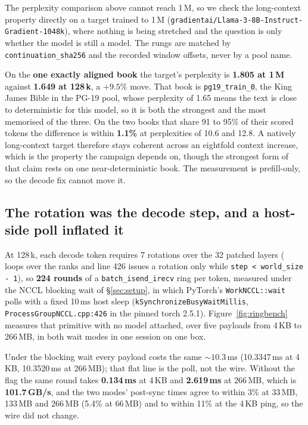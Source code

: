 \documentclass{article}
\begin{document}
The perplexity comparison above cannot reach 1\,M, so we check the long-context property
directly on a target trained to 1\,M
(\texttt{gradientai/Llama-3-8B-Instruct-Gradient-1048k}), where nothing is being stretched and
the question is only whether the model is still a model. The rungs are matched by
\texttt{continuation\_sha256} and the recorded window offsets, never by a pool name.

On the \textbf{one exactly aligned book} the target's perplexity is \textbf{1.805 at 1\,M}
against \textbf{1.649 at 128\,k}, a \textbf{$+9.5\%$} move. That book is
\texttt{pg19\_train\_0}, the King James Bible in the PG-19 pool, whose perplexity of 1.65
means the text is close to deterministic for this model, so it is both the strongest and the
most memorised of the three. On the two books that share 91 to 95\% of their scored tokens the
difference is within \textbf{1.1\%} at perplexities of 10.6 and 12.8. A natively long-context target therefore stays coherent across an eightfold context increase,
which is the property the campaign depends on, though the strongest form of that claim rests on
one near-deterministic book. The measurement is prefill-only, so the decode fix cannot move it.

\subsection{The rotation was the decode step, and a host-side poll inflated it}
\label{sec:res-decode}

At 128\,k, each decode token requires 7 rotations over the 32 patched layers
( loops over the ranks and line 426 issues a
rotation only while \texttt{step < world\_size - 1}), so \textbf{224 rounds} of a
\texttt{batch\_isend\_irecv} ring per token, measured under the NCCL blocking wait of
\S\ref{sec:setup}, in which PyTorch's \texttt{WorkNCCL::wait} polls with a fixed 10\,ms host
sleep (\texttt{kSynchronizeBusyWaitMillis}, \texttt{ProcessGroupNCCL.cpp:426} in the pinned
torch 2.5.1). Figure~\ref{fig:ringbench} measures that primitive with no model attached, over
five payloads from 4\,KB to 266\,MB, in both wait modes in one session on one box.

Under the blocking wait every payload costs the same ${\sim}10.3$\,ms (10.3347\,ms at
4\,KB, 10.3520\,ms at 266\,MB); that flat line is the poll, not the wire. Without the flag the
same round takes \textbf{0.134\,ms} at 4\,KB and \textbf{2.619\,ms} at 266\,MB, which is
\textbf{101.7\,GB/s}, and the two modes' post-sync times agree to within 3\% at 33\,MB,
133\,MB and 266\,MB (5.4\% at 66\,MB) and to within 11\% at the 4\,KB ping, so the wire did
not change.
\end{document}
